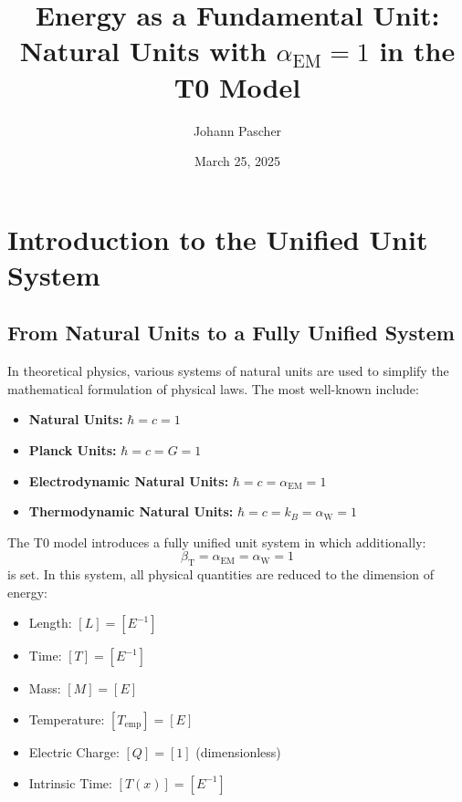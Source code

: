 \documentclass[12pt,a4paper]{article}
\newcommand{\Tfield}{T(x)}
\newcommand{\betaT}{\beta_{\text{T}}}
\newcommand{\alphaEM}{\alpha_{\text{EM}}}
\newcommand{\alphaW}{\alpha_{\text{W}}}
\begin{document}
	
	\title{Energy as a Fundamental Unit: \\ Natural Units with \(\alphaEM = 1\) in the T0 Model}
	\author{Johann Pascher}
	\date{March 25, 2025}
	
	\maketitle
	\tableofcontents
	\newpage
	
	\section{Introduction to the Unified Unit System}
	\label{sec:intro}
	
	\subsection{From Natural Units to a Fully Unified System}
	\label{subsec:natural_units}
	
	In theoretical physics, various systems of natural units are used to simplify the mathematical formulation of physical laws. The most well-known include:
	
	\begin{itemize}
		\item \textbf{Natural Units:} \(\hbar = c = 1\)
		\item \textbf{Planck Units:} \(\hbar = c = G = 1\)
		\item \textbf{Electrodynamic Natural Units:} \(\hbar = c = \alphaEM = 1\)
		\item \textbf{Thermodynamic Natural Units:} \(\hbar = c = k_B = \alphaW = 1\)
	\end{itemize}
	
	The T0 model introduces a fully unified unit system in which additionally:
	\begin{equation}
		\label{eq:unified_system}
		\betaT = \alphaEM = \alphaW = 1
	\end{equation}
	is set. In this system, all physical quantities are reduced to the dimension of energy:
	
	\begin{tcolorbox}[colback=blue!5!white,colframe=blue!75!black,title=Dimensions in the Unified Unit System]
		\begin{itemize}
			\item Length: \([L] = [E^{-1}]\)
			\item Time: \([T] = [E^{-1}]\)
			\item Mass: \([M] = [E]\)
			\item Temperature: \([T_{\text{emp}}] = [E]\)
			\item Electric Charge: \([Q] = [1]\) (dimensionless)
			\item Intrinsic Time: \([\Tfield] = [E^{-1}]\)
		\end{itemize}
	\end{tcolorbox}
	
\end{document}
